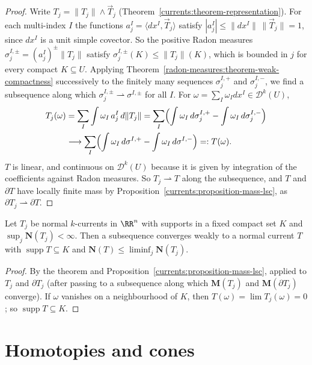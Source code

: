 \begin{proof}
Write $T_j = \|T_j\| \wedge \vec{T}_j$ (Theorem~\ref{currents:theorem-representation}). For each multi-index $I$ the functions $a_j^I = \langle dx^I, \vec{T}_j\rangle$ satisfy $|a_j^I| \leq \|dx^I\|\,\|\vec{T}_j\| = 1$,
since $dx^I$ is a unit simple covector. So the positive Radon measures $\sigma_j^{I,\pm} = (a_j^I)^{\pm}\|T_j\|$ satisfy $\sigma_j^{I,\pm}(K) \leq \|T_j\|(K)$, which is bounded in $j$ for every compact $K \subseteq U$.
Applying Theorem~\ref{radon-measures:theorem-weak-compactness} successively to the finitely many sequences $\sigma_j^{I,+}$ and $\sigma_j^{I,-}$, we find a subsequence along which $\sigma_j^{I,\pm} \rightharpoonup \sigma^{I,\pm}$ for all
$I$. For $\omega = \sum_I\omega_Idx^I \in \mathcal{D}^k(U)$,
\[\begin{aligned}
T_j(\omega) &= \sum_I\int\omega_I\,a_j^I\,d\|T_j\| = \sum_I\Bigl(\int\omega_I\,d\sigma_j^{I,+} - \int\omega_I\,d\sigma_j^{I,-}\Bigr) \\
&\longrightarrow \sum_I\Bigl(\int\omega_I\,d\sigma^{I,+} - \int\omega_I\,d\sigma^{I,-}\Bigr) =: T(\omega).
\end{aligned}\]
$T$ is linear, and continuous on $\mathcal{D}^k(U)$ because it is given by integration of the coefficients against Radon measures. So $T_j \rightharpoonup T$ along the subsequence, and $T$ and $\partial T$ have locally finite
mass by Proposition~\ref{currents:proposition-mass-lsc}, as $\partial T_j \rightharpoonup \partial T$.
\end{proof}

\begin{corollary}\label{currents:corollary-normal-compactness}
Let $T_j$ be normal $k$-currents in $\RR^n$ with supports in a fixed compact set $K$ and $\sup_j\mathbf{N}(T_j) < \infty$. Then a subsequence converges weakly to a normal current $T$ with
$\operatorname{supp}T \subseteq K$ and $\mathbf{N}(T) \leq \liminf_j\mathbf{N}(T_j)$.
\end{corollary}

\begin{proof}
By the theorem and Proposition~\ref{currents:proposition-mass-lsc}, applied to $T_j$ and $\partial T_j$ (after passing to a subsequence along which $\mathbf{M}(T_j)$ and $\mathbf{M}(\partial T_j)$ converge). If $\omega$ vanishes on a
neighbourhood of $K$, then $T(\omega) = \lim T_j(\omega) = 0$; so $\operatorname{supp}T \subseteq K$.
\end{proof}

\section{Homotopies and cones}\label{currents:section-homotopies}

